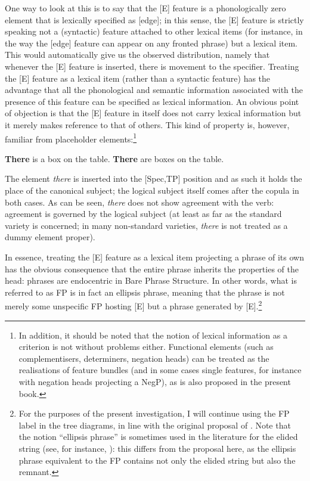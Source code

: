 One way to look at this is to say that the [E] feature is a phonologically zero element that is lexically specified as [edge]; in this sense, the [E] feature is strictly speaking not a (syntactic) feature attached to other lexical items (for instance, in the way the [edge] feature can appear on any fronted phrase) but a lexical item. This would automatically give us the observed distribution, namely that whenever the [E] feature is inserted, there is movement to the specifier. Treating the [E] feature as a lexical item (rather than a syntactic feature) has the advantage that all the phonological and semantic information associated with the presence of this feature can be specified as lexical information. An obvious point of objection is that the [E] feature in itself does not carry lexical information but it merely makes reference to that of others. This kind of property is, however, familiar from placeholder elements:\footnote{In addition, it should be noted that the notion of lexical information as a criterion is not without problems either. Functional elements (such as complementisers, determiners, negation heads) can be treated as the realisations of feature bundles (and in some cases single features, for instance with negation heads projecting a NegP), as is also proposed in the present book.}

\ea
\ea \textbf{There} is a box on the table.
\ex \textbf{There} are boxes on the table.
\z
\z

The element \textit{there} is inserted into the [Spec,TP] position and as such it holds the place of the canonical subject; the logical subject itself comes after the copula in both cases. As can be seen, \textit{there} does not show agreement with the verb: agreement is governed by the logical subject (at least as far as the standard variety is concerned; in many non-standard varieties, \textit{there} is not treated as a dummy element proper).

In essence, treating the [E] feature as a lexical item projecting a phrase of its own has the obvious consequence that the entire phrase inherits the properties of the head: phrases are endocentric in Bare Phrase Structure. In other words, what is referred to as FP is in fact an ellipsis phrase, meaning that the phrase is not merely some unspecific FP hosting [E] but a phrase generated by [E].\footnote{For the purposes of the present investigation, I will continue using the FP label in the tree diagrams, in line with the original proposal of \citet{merchant2001}. Note that the notion “ellipsis phrase” is sometimes used in the literature for the elided string (see, for instance, \citealt{hardtromero2004}): this differs from the proposal here, as the ellipsis phrase equivalent to the FP contains not only the elided string but also the remnant.}

